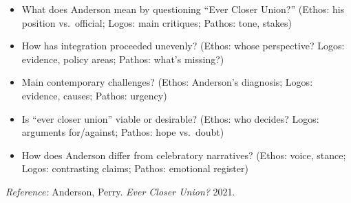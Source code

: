 \documentclass[11pt,a4paper]{article}
\begin{document}
\begin{itemize}
\item What does Anderson mean by questioning ``Ever Closer Union?'' (Ethos: his position vs.\ official; Logos: main critiques; Pathos: tone, stakes)
\item How has integration proceeded unevenly? (Ethos: whose perspective? Logos: evidence, policy areas; Pathos: what's missing?)
\item Main contemporary challenges? (Ethos: Anderson's diagnosis; Logos: evidence, causes; Pathos: urgency)
\item Is ``ever closer union'' viable or desirable? (Ethos: who decides? Logos: arguments for/against; Pathos: hope vs.\ doubt)
\item How does Anderson differ from celebratory narratives? (Ethos: voice, stance; Logos: contrasting claims; Pathos: emotional register)
\end{itemize}

\vspace{1em}
\noindent\footnotesize\textit{Reference:} Anderson, Perry. \textit{Ever Closer Union?} 2021.
\end{document}
